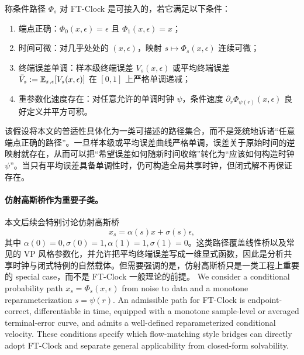 \begin{assumption}[可接入条件路径]
称条件路径 $\Phi_s$ 对 FT-Clock 是可接入的，若它满足以下条件：
\begin{enumerate}[leftmargin=1.5em,label=(\roman*)]
  \item 端点正确：$\Phi_0(x,\epsilon)=\epsilon$ 且 $\Phi_1(x,\epsilon)=x$；
  \item 时间可微：对几乎处处的 $(x,\epsilon)$，映射 $s \mapsto \Phi_s(x,\epsilon)$ 连续可微；
  \item 终端误差单调：样本级终端误差 $V_s(x,\epsilon)$ 或平均终端误差
  \(
    \bar{V}_s := \mathbb{E}_{x,\epsilon}[V_s(x,\epsilon)]
  \)
  在 $[0,1]$ 上严格单调递减；
  \item 重参数化速度存在：对任意允许的单调时钟 $\psi$，条件速度
  \(
    \partial_r \Phi_{\psi(r)}(x,\epsilon)
  \)
  良好定义并平方可积。
\end{enumerate}
\end{assumption}

该假设将本文的普适性具体化为一类可描述的路径集合，而不是笼统地诉诸“任意端点正确的路径”。一旦样本级或平均误差曲线严格单调，误差关于原始时间的逆映射就存在，从而可以把“希望误差如何随新时间收缩”转化为“应该如何构造时钟 $\psi$”。当只有平均误差具备单调性时，仍可构造全局共享时钟，但闭式解不再保证存在。

\paragraph{仿射高斯桥作为重要子类。}
本文后续会特别讨论仿射高斯桥
\begin{equation}
  x_s = \alpha(s)x + \sigma(s)\epsilon,
\end{equation}
其中 $\alpha(0)=0,\sigma(0)=1,\alpha(1)=1,\sigma(1)=0$。这类路径覆盖线性桥以及常见的 VP 风格参数化，并允许把平均终端误差写成一维显式函数，因此是分析共享时钟与闭式特例的自然载体。但需要强调的是，仿射高斯桥只是一类工程上重要的 special case，而不是 FT-Clock 一般理论的前提。
\else
We consider a conditional probability path $x_s=\Phi_s(x,\epsilon)$ from noise to data and a monotone reparameterization $s=\psi(r)$. An admissible path for FT-Clock is endpoint-correct, differentiable in time, equipped with a monotone sample-level or averaged terminal-error curve, and admits a well-defined reparameterized conditional velocity. These conditions specify which flow-matching style bridges can directly adopt FT-Clock and separate general applicability from closed-form solvability.
\fi
